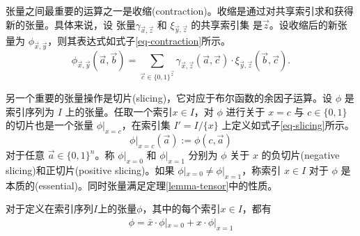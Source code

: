 张量之间最重要的运算之一是收缩(contraction)。收缩是通过对共享索引求和获得新的张量。具体来说，设 张量$\gamma_{\overrightarrow{x},\overrightarrow{z}}$ 和 $\xi_{\overrightarrow{y},\overrightarrow{z}}$ 的共享索引集 是$\overrightarrow{z}$。设收缩后的新张量为 $\phi_{\overrightarrow{x},\overrightarrow{y}}$，则其表达式如式子\ref{eq-contraction}所示。
\begin{equation}
\label{eq-contraction}
\phi_{\overrightarrow{x},\overrightarrow{y}}(\overrightarrow{a},\overrightarrow{b}) = \sum_{\overrightarrow{c} \in \{0,1\}^{\overrightarrow{z}}} \gamma_{\overrightarrow{x},\overrightarrow{z}}(\overrightarrow{a}, \overrightarrow{c}) \cdot \xi_{\overrightarrow{y},\overrightarrow{z}}(\overrightarrow{b}, \overrightarrow{c}).
\end{equation}

另一个重要的张量操作是切片(slicing)，它对应于布尔函数的余因子运算。设 $\phi$ 是索引序列为 $I$ 上的张量。任取一个索引\(x\in I\)，对 $\phi$ 进行关于 $x = c$ 与 $c \in \{0, 1\}$ 的切片也是一个张量 $\phi|_{x=c}$，在索引集 $I' =I/\{x\}$ 上定义如式子\ref{eq-slicing}所示。
\begin{equation}
    \label{eq-slicing}
\phi|_{x=c}(\overrightarrow{a}) := \phi(c, \overrightarrow{a})
\end{equation}
对于任意 $\overrightarrow{a} \in \{0, 1\}^n$。称 $\phi|_{x=0}$ 和 $\phi|_{x=1}$ 分别为 $\phi$ 关于 $x$ 的负切片(negative slicing)和正切片(positive slicing)。如果 $\phi|_{x=0} \neq \phi|_{x=1}$，称索引 $x \in I$ 对于 $\phi$ 是本质的(essential)。同时张量满足定理\ref{lemma-tensor}中的性质。

\begin{lemma}
    \label{lemma-tensor}
    对于定义在索引序列\(I\)上的张量\(\phi\)，其中的每个索引\(x\in I\)，都有
    \begin{align}
        \phi = \bar{x}\cdot \phi|_{x=0}+x\cdot \phi|_{x=1}
    \end{align}
\end{lemma}

